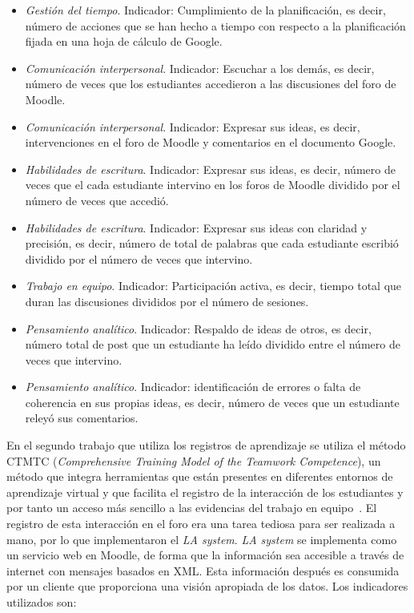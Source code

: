 \begin{itemize}
\item \emph{Gestión del tiempo}. Indicador: Cumplimiento de la planificación, es decir, número de acciones que se han hecho a tiempo con respecto a la planificación fijada en una hoja de cálculo de Google.
\item \emph{Comunicación interpersonal}. Indicador: Escuchar a los demás, es decir, número de veces que los estudiantes accedieron a las discusiones del foro de Moodle.
\item \emph{Comunicación interpersonal}. Indicador: Expresar sus ideas, es decir, intervenciones en el foro de Moodle y comentarios en el documento Google.
\item \emph{Habilidades de escritura}. Indicador: Expresar sus ideas, es decir, número de veces que el cada estudiante intervino en los foros de Moodle dividido por el número de veces que accedió.
\item \emph{Habilidades de escritura}. Indicador: Expresar sus ideas con claridad y precisión, es decir, número de total de palabras que cada estudiante escribió dividido por el número de veces que intervino.
\item \emph{Trabajo en equipo}. Indicador: Participación activa, es decir, tiempo total que duran las discusiones divididos por el número de sesiones.
\item \emph{Pensamiento analítico}. Indicador: Respaldo de ideas de otros, es decir, número total de post que un estudiante ha leído dividido entre el número de veces que intervino.
\item \emph{Pensamiento analítico}. Indicador: identificación de errores o falta de coherencia en sus propias ideas, es decir, número de veces que un estudiante releyó sus comentarios.
\end{itemize}

En el segundo trabajo que utiliza los registros de aprendizaje se utiliza el método CTMTC (\emph{Comprehensive Training Model of the Teamwork Competence}), un método que integra herramientas que están presentes en diferentes entornos de aprendizaje virtual y que facilita el registro de la interacción de los estudiantes y por tanto un acceso más sencillo a las evidencias del trabajo en equipo~\cite{fidalgo:2015}. El registro de esta interacción en el foro era una tarea tediosa para ser realizada a mano, por lo que implementaron el \emph{LA system}. \emph{LA system} se implementa como un servicio web en Moodle, de forma que la información sea accesible a través de internet con mensajes basados en XML. Esta información después es consumida por un cliente que proporciona una visión apropiada de los datos. Los indicadores utilizados son:

